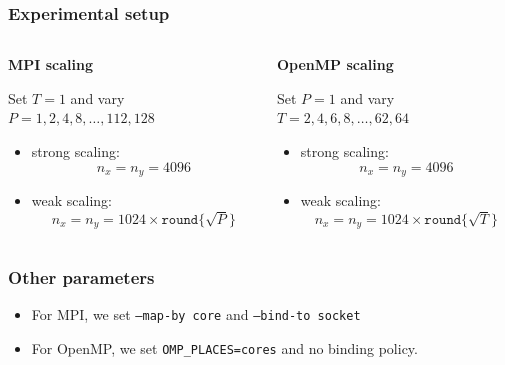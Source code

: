 \documentclass{beamer}
\begin{document}
\begin{frame}
    \frametitle{Experimental setup}

    \begin{columns}
        \begin{column}{0.5\textwidth}
            \center

            \textbf{MPI scaling}
            
            Set $T=1$ and vary $P = 1,2,4,8, \dots, 112, 128$

            \begin{itemize}
                \item strong scaling: $$n_x = n_y = 4096$$
                \item weak scaling: $$n_x = n_y = 1024 \times \texttt{round} \{\sqrt{P}\}$$
            \end{itemize}
        \end{column}

        \begin{column}{0.5\textwidth}
            \center
            \textbf{OpenMP scaling}
            
            Set $P=1$ and vary $T = 2,4,6,8, \dots, 62,64$
            
            \begin{itemize}
                \item strong scaling: $$n_x = n_y = 4096$$
                \item weak scaling:
                $$n_x = n_y = 1024 \times \texttt{round} \{\sqrt{T}\}$$
            \end{itemize}

        \end{column}
    
    \end{columns}

\end{frame}

\begin{frame}
    \frametitle{Other parameters}
        \begin{itemize}
            \item For MPI, we set \texttt{--map-by core} and \texttt{--bind-to socket}
            \item For OpenMP, we set \texttt{OMP\_PLACES=cores} and no binding policy.
        \end{itemize}
\end{frame}
\end{document}
